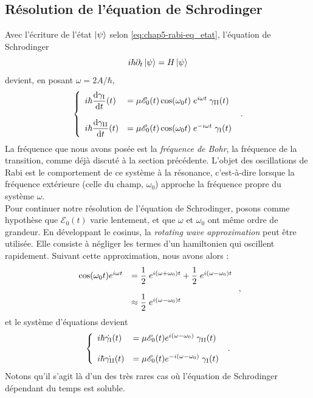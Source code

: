 \documentclass[../notesdecours.tex]{subfiles}
\begin{document}
\subsection{Résolution de l'équation de Schrodinger}
Avec l'écriture de l'état $\ket \psi$ selon \eqref{eq:chap5-rabi-eq_etat}, l'équation de Schrodinger 
$$i\hbar \partial_t \ket \psi = H\ket \psi$$
devient, en posant $\omega=2A/\hbar$, 
$$\left\{
    \begin{array}{ll}
        i\hbar \dfrac{\mathrm{d}\gamma_\mathrm{I}}{\mathrm{d}t}(t) &= \mu \mathcal{E}_0(t)\cos(\omega_0 t)\; e^{i\omega t}\; \gamma_\mathrm{II}(t) \\
        \strut \\
        i\hbar \dfrac{\mathrm{d}\gamma_\mathrm{II}}{\mathrm{d}t}(t) &= \mu \mathcal{E}_0(t)\cos(\omega_0 t)\; e^{-i\omega t}\; \gamma_\mathrm{I}(t) 
    \end{array}
\right. \; .$$
La fréquence que nous avons posée est la \textit{fréquence de Bohr}, la fréquence de la transition, comme déjà discuté à la section précédente. L'objet des oscillations de Rabi est le comportement de ce système à la résonance, c'est-à-dire lorsque la fréquence extérieure (celle du champ, $\omega_0$) approche la fréquence propre du système $\omega$. \\

Pour continuer notre résolution de l'équation de Schrodinger, posons comme hypothèse que $\mathcal{E}_0(t)$ varie lentement{\color{red}{à quoi ça nous sert?}}, et que $\omega$ et $\omega_0$ ont même ordre de grandeur. En développant le cosinus, la \textit{rotating wave approximation} peut être utilisée. Elle consiste à négliger les termes d'un hamiltonien qui oscillent rapidement. Suivant cette approximation, nous avons alors :
$$\begin{array}{ll}
    \cos(\omega_0 t) e^{i\omega t}&= \dfrac{1}{2} \; e^{i(\omega +\omega_0)t} + \dfrac{1}{2} \; e^{i(\omega -\omega_0)t} \\
    \strut \\
    &\approx \dfrac{1}{2} \; e^{i(\omega -\omega_0)t}
\end{array}\; ,$$
et le système d'équations devient 
$$\left\{
    \begin{array}{ll}
        i\hbar\dot{\gamma_\mathrm{I}}(t) &= \mu \mathcal{E}_0(t)e^{i(\omega-\omega_0)}\; \gamma_\mathrm{II}(t) \\
        \strut \\
        i\hbar \dot{\gamma_\mathrm{II}}(t) &= \mu \mathcal{E}_0(t)e^{-i(\omega-\omega_0)}\; \gamma_\mathrm{I}(t) 
    \end{array}
\right. \; .$$
Notons qu'il s'agit là d'un des très rares cas où l'équation de Schrodinger dépendant du temps est soluble. \\
\end{document}
